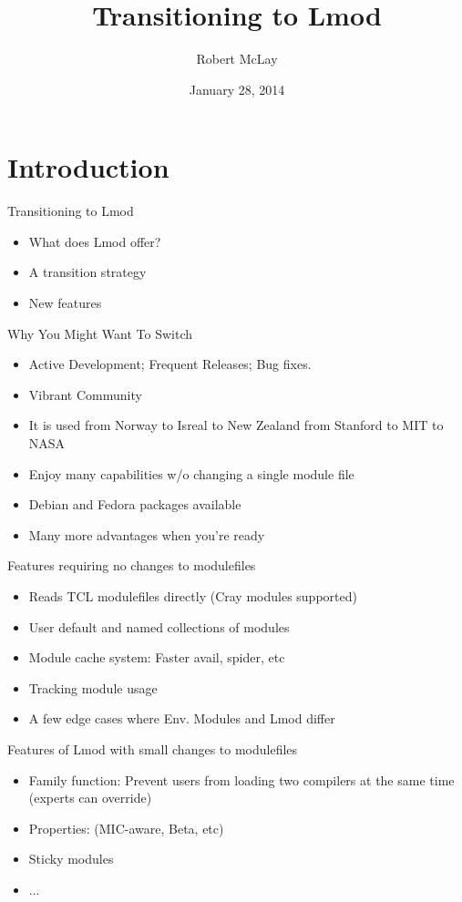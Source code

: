 \documentclass{beamer}
\title{Transitioning to Lmod}
\author{Robert McLay}
\institute{The Texas Advanced Computing Center}
\date{January 28, 2014}  %
\begin{document}
\begin{frame}
  \titlepage
\end{frame}

\section{Introduction}

\begin{frame}{Transitioning to Lmod}
  \begin{itemize}
    \item What does Lmod offer?
    \item A transition strategy
    \item New features
  \end{itemize}
\end{frame}


\begin{frame}{Why You Might Want To Switch}
  \begin{itemize}
    \item Active Development;  Frequent Releases; Bug fixes.
    \item Vibrant Community
    \item It is used from Norway to Isreal to New Zealand from Stanford to MIT to NASA
    \item Enjoy many capabilities w/o changing a single module file
    \item Debian and Fedora packages available
    \item Many more advantages when you're ready
  \end{itemize}
\end{frame}

\begin{frame}{Features requiring no changes to modulefiles}
  \begin{itemize}
    \item Reads TCL modulefiles directly (Cray modules supported)
    \item User default and named collections of modules
    \item Module cache system: Faster avail, spider, etc
    \item Tracking module usage 
    \item A few edge cases where Env. Modules and Lmod differ
  \end{itemize}
\end{frame}

\begin{frame}{Features of Lmod with small changes to modulefiles}
  \begin{itemize}
    \item Family function: Prevent users from loading two compilers at
      the same time (experts can override)
    \item Properties: (MIC-aware, Beta, etc)
    \item Sticky modules
    \item ...
  \end{itemize}
\end{frame}
\end{document}
